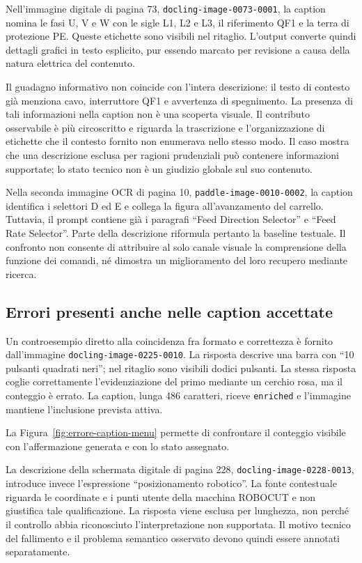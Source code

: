 Nell'immagine digitale di pagina 73, \texttt{docling-image-0073-0001}, la caption nomina le fasi U, V e W con le sigle L1, L2 e L3, il riferimento QF1 e la terra di protezione PE. Queste etichette sono visibili nel ritaglio. L'output converte quindi dettagli grafici in testo esplicito, pur essendo marcato per revisione a causa della natura elettrica del contenuto.

Il guadagno informativo non coincide con l'intera descrizione: il testo di contesto già menziona cavo, interruttore QF1 e avvertenza di spegnimento. La presenza di tali informazioni nella caption non è una scoperta visuale. Il contributo osservabile è più circoscritto e riguarda la trascrizione e l'organizzazione di etichette che il contesto fornito non enumerava nello stesso modo. Il caso mostra che una descrizione esclusa per ragioni prudenziali può contenere informazioni supportate; lo stato tecnico non è un giudizio globale sul suo contenuto.

Nella seconda immagine OCR di pagina 10, \texttt{paddle-image-0010-0002}, la caption identifica i selettori D ed E e collega la figura all'avanzamento del carrello. Tuttavia, il prompt contiene già i paragrafi \enquote{Feed Direction Selector} e \enquote{Feed Rate Selector}. Parte della descrizione riformula pertanto la baseline testuale. Il confronto non consente di attribuire al solo canale visuale la comprensione della funzione dei comandi, né dimostra un miglioramento del loro recupero mediante ricerca.

\subsection{Errori presenti anche nelle caption accettate}

Un controesempio diretto alla coincidenza fra formato e correttezza è fornito dall'immagine \texttt{docling-image-0225-0010}. La risposta descrive una barra con \enquote{10 pulsanti quadrati neri}; nel ritaglio sono visibili dodici pulsanti. La stessa risposta coglie correttamente l'evidenziazione del primo mediante un cerchio rosa, ma il conteggio è errato. La caption, lunga 486 caratteri, riceve \texttt{enriched} e l'immagine mantiene l'inclusione prevista attiva.

La Figura~\ref{fig:errore-caption-menu} permette di confrontare il conteggio visibile con l'affermazione generata e con lo stato assegnato.



La descrizione della schermata digitale di pagina 228, \texttt{docling-image-0228-0013}, introduce invece l'espressione \enquote{posizionamento robotico}. La fonte contestuale riguarda le coordinate e i punti utente della macchina ROBOCUT e non giustifica tale qualificazione. La risposta viene esclusa per lunghezza, non perché il controllo abbia riconosciuto l'interpretazione non supportata. Il motivo tecnico del fallimento e il problema semantico osservato devono quindi essere annotati separatamente.

